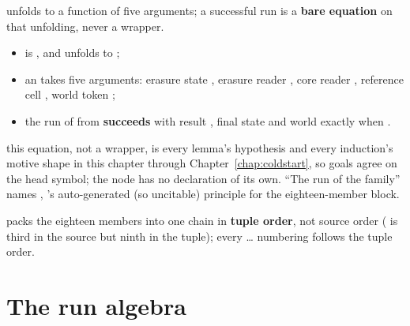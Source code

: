 \begin{definition}
\label{def:run-spelling}
  unfolds to a function of five arguments; a successful run is a
\textbf{bare equation} on that unfolding, never a wrapper.
\begin{itemize}
\item {} is , and
 unfolds to ;
\item an  takes five arguments: erasure state , erasure reader
, core reader , reference cell , world token ;
\item {} the run of  from  \textbf{succeeds} with result
, final state  and world  exactly when
.
\end{itemize}
 this equation, not a  wrapper, is every lemma's hypothesis and every
induction's motive shape in this chapter through Chapter~\ref{chap:coldstart}, so goals agree on the
head symbol; the node has no declaration of its own. ``The run of the family'' names
,
's auto-generated (so uncitable) principle for the eighteen-member
 block.
\end{definition}

\begin{remark}
  packs the eighteen members into one  chain in
\textbf{tuple order}, not source order ( is third in the source but ninth in the
tuple); every  \ldots {} numbering follows the tuple order.
\end{remark}

\section{The run algebra}
\label{sec:run:algebra}

